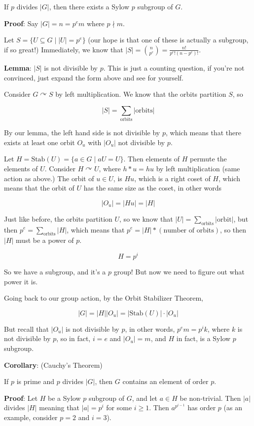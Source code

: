 \documentclass[12pt]{article}
\def\Stab{\text{Stab}}
\def\acts{\curvearrowright}
\begin{document}
If $p$ divides $|G|$, then there exists a Sylow $p$ subgroup of $G$.

{\bf Proof}: Say $|G| = n = p^e m$ where $p \nmid m$.

Let $S = \{U \subseteq G \mid |U| = p^e \}$ (our hope is that one
of these is actually a subgroup, if so great!) Immediately, we know that $|S| =
\binom{n}{p^e} = \frac{n!}{p^e! (n - p^e)!}$.

{\bf Lemma}: $|S|$ is not divisible by $p$. This is just a counting question, if
you're not convinced, just expand the form above and see for yourself.

Consider $G \acts S$ by left multiplication. We know that the orbits partition
$S$, so

\[
  |S| = \sum_{\text{orbits}} |\text{orbits}|
\]

By our lemma, the left hand side is not divisible by $p$, which means that there
exists at least one orbit $O_u$ with $|O_u|$ not divisible by $p$.

Let $H = \Stab(U) = \{a \in G \mid aU = U\}$. Then elements of $H$ permute the
elements of $U$. Consider $H \acts U$, where $h * u = hu$ by left multiplication
(same action as above.) The orbit of $u \in U$, is $Hu$, which is a right coset
of $H$, which means that the orbit of $U$ has the same size as the coset, in
other words

\[
  |O_u| = |Hu| = |H|
\]

Just like before, the orbits partition $U$, so we know that $|U| =
\sum_{\text{orbits}} |\text{orbit}|$, but then $p^e = \sum_{\text{orbits}}
|H|$, which means that $p^e = |H| * (\text{number of orbits})$, so then $|H|$
must be a power of $p$.

\[
  H = p^i
\]

So we have a subgroup, and it's a $p$ group! But now we need to figure out what
power it is.

Going back to our group action, by the Orbit Stabilizer Theorem,

\[
  |G| = |H| |O_u| = |\Stab(U)| \cdot |O_u|
\]

But recall that $|O_u|$ is not divisible by $p$, in other words, $p^em = p^i k$,
where $k$ is not divisible by $p$, so in fact, $i = e$ and $|O_u| = m$, and $H$
in fact, is a Sylow $p$ subgroup.

{\bf Corollary}: (Cauchy's Theorem)

If $p$ is prime and $p$ divides $|G|$, then $G$ contains an element of order
$p$.

{\bf Proof}: Let $H$ be a Sylow $p$ subgroup of $G$, and let $a \in H$ be
non-trivial. Then $|a|$ divides $|H|$ meaning that $|a| = p^i$ for some $i \ge
1$. Then $a^{p^{i - 1}}$ has order $p$ (as an example, consider $p = 2$ and $i =
3$).
\end{document}

